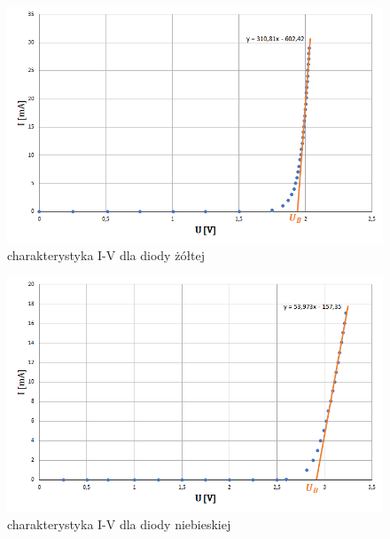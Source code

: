 \documentclass[polish, 11pt, a4paper]{article}
\begin{document}
\begin{table}[H]
\begin{minipage}{.5\textwidth}
\begin{tabular}{|c|rl|S[table-format=3.3, output-decimal-marker = {,}]|S[table-format=1.3, output-decimal-marker = {,}]|}
				\end{tabular}
				\renewcommand{\arraystretch}{1}
			\end{minipage}
		\end{table}
		
		\begin{figure}[H]
    		\centering
    		\caption{charakterystyka I-V dla diody żółtej}
    		\includegraphics[width=\textwidth]{Fizyka48Wykres1}
		\end{figure}
		
		\begin{figure}[H]
    		\centering
    		\caption{charakterystyka I-V dla diody niebieskiej}
    		\includegraphics[width=\textwidth]{Fizyka48Wykres2}
		\end{figure}
		
\end{document}
